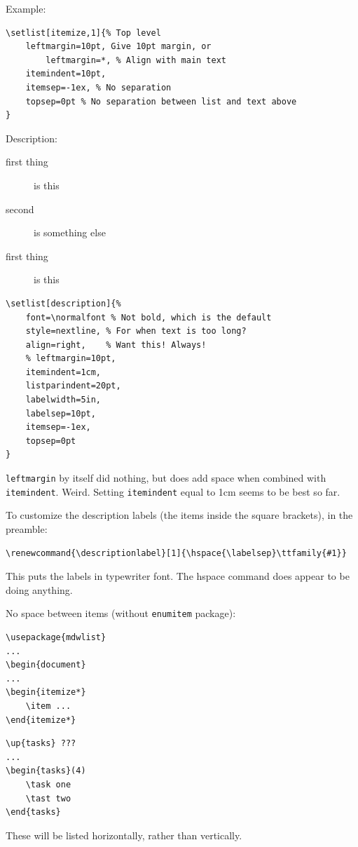 \documentclass{article}
\renewcommand{\descriptionlabel}[1]{%
    \hspace{\labelsep} %
    \ttfamily{#1}}
\begin{document}
Example:
\begin{verbatim}
\setlist[itemize,1]{% Top level
    leftmargin=10pt, Give 10pt margin, or
        leftmargin=*, % Align with main text
    itemindent=10pt,
    itemsep=-1ex, % No separation
    topsep=0pt % No separation between list and text above
}
\end{verbatim}

Description:

\begin{description}%
    \item [first thing] is this
    \item [second] is something else
    \item [first thing] is this
\end{description}

\begin{verbatim}
\setlist[description]{%
    font=\normalfont % Not bold, which is the default
    style=nextline, % For when text is too long?
    align=right,    % Want this! Always!
    % leftmargin=10pt,
    itemindent=1cm,
    listparindent=20pt,
    labelwidth=5in,
    labelsep=10pt,
    itemsep=-1ex,
    topsep=0pt
}
\end{verbatim}

\verb|leftmargin| by itself did nothing, but does add space when combined
with \verb|itemindent|. Weird.
Setting \verb|itemindent| equal to 1cm seems to be best so far.



To customize the description labels (the items inside the square
brackets), in the preamble:
\begin{verbatim}
\renewcommand{\descriptionlabel}[1]{\hspace{\labelsep}\ttfamily{#1}}
\end{verbatim}
This puts the labels in typewriter font. The hspace command does appear
to be doing anything.

No space between items (without \verb|enumitem| package):
\begin{verbatim}
\usepackage{mdwlist}
...
\begin{document}
...
\begin{itemize*}
    \item ...
\end{itemize*}
\end{verbatim}

\begin{verbatim}
\up{tasks} ???
...
\begin{tasks}(4)
    \task one
    \tast two
\end{tasks}
\end{verbatim}
These will be listed horizontally, rather than vertically.
\end{document}
